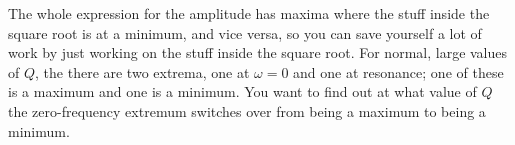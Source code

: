 The whole expression for the amplitude has maxima where the
stuff inside the square root is at a minimum, and vice versa, so
you can save yourself a lot of work by just working on the stuff
inside the square root. For normal, large values of $Q$, the
there are two extrema, one at $\omega=0$ and one at
resonance; one of these is a maximum and one is a minimum.
You want to find out at what value of $Q$ the zero-frequency extremum
switches over from being a maximum to being a minimum.



